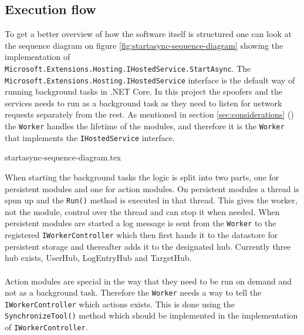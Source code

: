 \documentclass{article}
\begin{document}
\subsection{Execution flow}
To get a better overview of how the software itself is structured one can look at the sequence diagram on figure \ref{fig:startasync-sequence-diagram} showing the implementation of \texttt{Microsoft.Extensions.Hosting.IHostedService.StartAsync}. The \texttt{Microsoft.Extensions.Hosting.IHostedService} interface is the default way of running background tasks in .NET Core\cite{url:implementation:microsoft:hosted-service}. In this project the spoofers and the services needs to run as a background task as they need to listen for network requests separately from the rest. As mentioned in section \ref{sec:considerations} () the \texttt{Worker} handles the lifetime of the modules, and therefore it is the \texttt{Worker} that implements the \texttt{IHostedService} interface.

{startasync-sequence-diagram.tex}

When starting the background tasks the logic is split into two parts, one for persistent modules and one for action modules. On persistent modules a thread is spun up and the \texttt{Run()} method is executed in that thread. This gives the worker, not the module, control over the thread and can stop it when needed. When persistent modules are started a log message is sent from the \texttt{Worker} to the registered \texttt{IWorkerController} which then first hands it to the datastore for persistent storage and thereafter adds it to the designated hub. Currently three hub exists, UserHub, LogEntryHub and TargetHub.
\\\\
Action modules are special in the way that they need to be run on demand and not as a background task. Therefore the \texttt{Worker} needs a way to tell the \texttt{IWorkerController} which actions exists. This is done using the \texttt{SynchronizeTool()} method which should be implemented in the implementation of \texttt{IWorkerController}.
\end{document}
